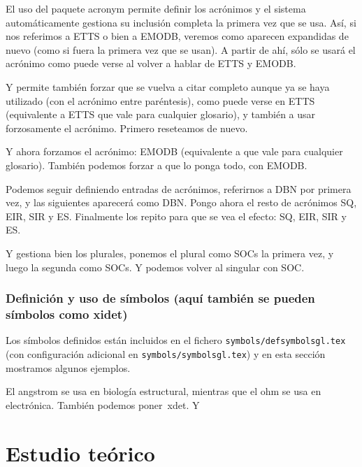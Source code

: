 \documentclass[spanish,openright]{book}
\begin{document}
\glsresetall[acronym]

El uso del paquete acronym permite definir los acrónimos y el sistema
automáticamente gestiona su inclusión completa la primera vez que se
usa. Así, si nos referimos a \ac{ETTS} o bien a \ac{EMODB}, veremos como
aparecen expandidas de nuevo (como si fuera la primera vez que se
usan). A partir de ahí, sólo se usará el acrónimo como puede verse al
volver a hablar de \ac{ETTS} y \ac{EMODB}.

Y permite también forzar que se vuelva a citar completo aunque ya se
haya utilizado (con el acrónimo entre paréntesis), como puede verse en
\acl{ETTS} (equivalente a \glsdesc{ETTS} que vale para cualquier
glosario), y también a usar forzosamente el acrónimo. Primero reseteamos
de nuevo.

\glsresetall[acronym]

Y ahora forzamos el acrónimo: \acs{EMODB} (equivalente a
 que vale para cualquier glosario). También podemos
forzar a que lo ponga todo, con \acf{EMODB}.


Podemos seguir definiendo entradas de acrónimos, referirnos a \ac{DBN}
por primera vez, y las siguientes aparecerá como \ac{DBN}.  Pongo ahora
el resto de acrónimos \ac{SQ}, \ac{EIR}, \ac{SIR} y
\ac{ES}. Finalmente los repito para que se vea el efecto: \ac{SQ},
\ac{EIR}, \ac{SIR} y \ac{ES}.

Y gestiona bien los plurales, ponemos el plural como \acp{SOC} la
primera vez, y luego la segunda como \acp{SOC}. Y podemos volver al
singular con \ac{SOC}.


\subsection{Definición y uso de símbolos (aquí también
  se pueden símbolos como \ac{xidet})}
\label{sec:simbolos}

Los símbolos definidos están incluidos en el fichero
\texttt{symbols/defsymbolsgl.tex} (con configuración adicional en
\texttt{symbols/symbolsgl.tex}) y en esta sección mostramos algunos
ejemplos.

El \ac{angstrom} se usa en biología estructural, mientras que el
\ac{ohm} se usa en electrónica. También podemos poner~\ac{xdet}. Y
 


\chapter{Estudio teórico}
\label{cha:estudio-teorico}
\end{document}
